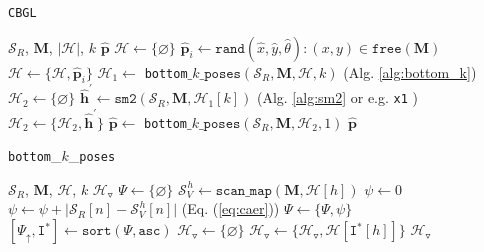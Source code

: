 \begin{algorithm}
  \caption{\texttt{CBGL}}
  \begin{spacing}{1.2}
  \begin{algorithmic}[1]
    \REQUIRE $\mathcal{S}_R$, $\bm{M}$, $|\mathcal{H}|$, $k$
    \ENSURE $\hat{\bm{p}}$
    \STATE $\mathcal{H} \leftarrow \{\varnothing\}$
      \STATE $\hat{\bm{p}}_i \leftarrow \texttt{rand}(\hat{x},\hat{y},\hat{\theta}): (x,y) \in \texttt{free}(\bm{M})$
      \STATE $\mathcal{H} \leftarrow \{\mathcal{H}, \hat{\bm{p}}_i\}$
    \ENDFOR
    \STATE $\mathcal{H}_1 \leftarrow$ \texttt{bottom}$\_k\_\texttt{poses}(\mathcal{S}_R, \bm{M}, \mathcal{H}, k)$ \hfill {\small (Alg. \ref{alg:bottom_k}})
    \STATE $\mathcal{H}_2 \leftarrow \{\varnothing \}$
      \STATE $\hat{\bm{h}}^\prime \leftarrow \texttt{sm2}(\mathcal{S}_R, \bm{M}, \mathcal{H}_1[k])$ \hfill {\small (Alg. \ref{alg:sm2} or e.g. \texttt{x1} \cite{Filotheou2023a}})
      \STATE $\mathcal{H}_2 \leftarrow \{\mathcal{H}_2, \hat{\bm{h}}^\prime\}$
    \ENDFOR
    \STATE $\hat{\bm{p}} \leftarrow$ \texttt{bottom}$\_k\_\texttt{poses}(\mathcal{S}_R, \bm{M}, \mathcal{H}_2, 1)$
    \RETURN $\hat{\bm{p}}$
  \end{algorithmic}
  \end{spacing}
  \label{alg:cbgl}
\end{algorithm}

\begin{algorithm}
  \caption{\texttt{bottom}\_$k$\_\texttt{poses}}
  \begin{spacing}{1.2}
  \begin{algorithmic}[1]
    \REQUIRE $\mathcal{S}_R$, $\bm{M}$, $\mathcal{H}$, $k$
    \ENSURE $\mathcal{H}_{\triangledown}$
    \STATE $\Psi \leftarrow \{\varnothing \}$
      \STATE $\mathcal{S}_V^{\hspace{1pt} h} \leftarrow \texttt{scan\_map}(\bm{M}, \mathcal{H}[h])$
      \STATE $\psi \leftarrow 0$
        \STATE $\psi \leftarrow \psi + \big|\mathcal{S}_R[n]-\mathcal{S}_V^{\hspace{1pt} h}[n]\big|$ \hfill {\small (Eq. (\ref{eq:caer})})
      \ENDFOR
      \STATE $\Psi \leftarrow \{\Psi, \psi\}$
    \ENDFOR
    \STATE $[\Psi_{\uparrow}, \texttt{I}^{\ast}] \leftarrow \texttt{sort}(\Psi, \texttt{asc})$
    \STATE $\mathcal{H}_{\triangledown} \leftarrow \{\varnothing \}$
      \STATE $\mathcal{H}_{\triangledown} \leftarrow \{\mathcal{H}_{\triangledown}, \mathcal{H}[\texttt{I}^{\ast}[h]]\}$
    \ENDFOR
    \RETURN $\mathcal{H}_{\triangledown}$
  \end{algorithmic}
  \end{spacing}
  \label{alg:bottom_k}
\end{algorithm}

